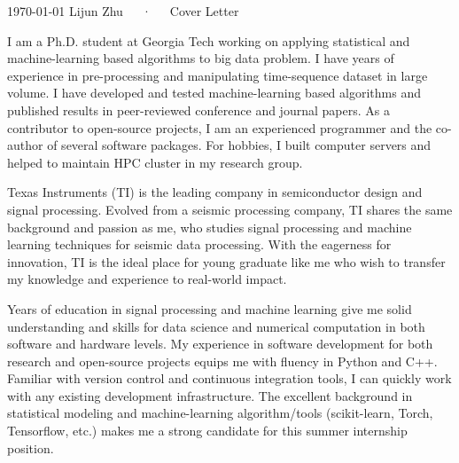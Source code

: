 \documentclass[11pt, a4paper]{awesome-cv}
\begin{document}
\makecvheader[R]

\makecvfooter
  {\today}
  {Lijun Zhu~~~·~~~Cover Letter}
  {}

\makelettertitle

\begin{cvletter}

I am a Ph.D. student at Georgia Tech working on applying statistical and machine-learning based algorithms to big data problem. 
I have years of experience in pre-processing and manipulating time-sequence dataset in large volume. 
I have developed and tested machine-learning based algorithms and published results in peer-reviewed conference and journal papers. 
As a contributor to open-source projects, I am an experienced programmer and the co-author of several software packages. 
For hobbies, I built computer servers and helped to maintain HPC cluster in my research group.

Texas Instruments (TI) is the leading company in semiconductor design and signal processing. 
Evolved from a seismic processing company, TI shares the same background and passion as me, who studies signal processing and machine learning techniques for seismic data processing. 
With the eagerness for innovation, TI is the ideal place for young graduate like me who wish to transfer my knowledge and experience to real-world impact. 

Years of education in signal processing and machine learning give me solid understanding and skills for data science and numerical computation in both software and hardware levels. 
My experience in software development for both research and open-source projects equips me with fluency in Python and C++. 
Familiar with version control and continuous integration tools, I can quickly work with any existing development infrastructure. 
The excellent background in statistical modeling and machine-learning algorithm/tools (scikit-learn, Torch, Tensorflow, etc.) makes me a strong candidate for this summer internship position. 
\end{cvletter}


\makeletterclosing
\end{document}
